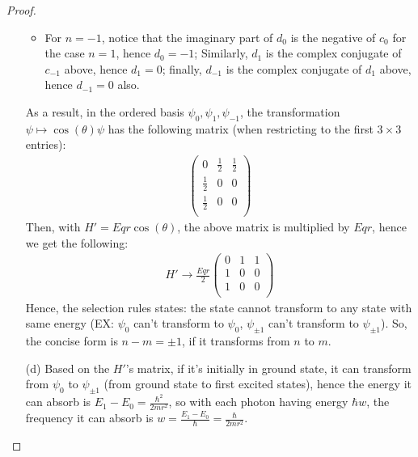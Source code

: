 \documentclass{article}
\begin{document}
\begin{proof}
\begin{itemize}
\begin{itemize}
            \item For $n=-1$, notice that the imaginary part of $d_0$ is the negative of $c_0$ for the case $n=1$, hence $d_0=-1$; Similarly, $d_1$ is the complex conjugate of $c_{-1}$ above, hence $d_1=0$; finally, $d_{-1}$ is the complex conjugate of $d_1$ above, hence $d_{-1}=0$ also.
        \end{itemize}
        As a result, in the ordered basis $\psi_0,\psi_1,\psi_{-1}$, the transformation $\psi\mapsto \cos(\theta)\psi$ has the following matrix (when restricting to the first $3\times 3$ entries):
        \begin{align}
            \begin{pmatrix}
                0 & \frac{1}{2} & \frac{1}{2}\\
                \frac{1}{2} & 0 & 0\\
                \frac{1}{2} & 0 & 0\\
            \end{pmatrix}
        \end{align}
        Then, with $H' = Eqr\cos(\theta)$, the above matrix is multiplied by $Eqr$, hence we get the following:
        \begin{align}
            H' \longrightarrow \frac{Eqr}{2}\begin{pmatrix}
                0 & 1 & 1\\
                1 & 0 & 0\\
                1 & 0 & 0\\
            \end{pmatrix}
        \end{align}
        Hence, the selection rules states: the state cannot transform to any state with same energy (EX: $\psi_0$ can't transform to $\psi_0$, $\psi_{\pm 1}$ can't transform to $\psi_{\pm 1}$). So, the concise form is $n-m = \pm 1$, if it transforms from $n$ to $m$.

        \hfil

        \item[(d)] Based on the $H'$'s matrix, if it's initially in ground state, it can transform from $\psi_0$ to $\psi_{\pm 1}$ (from ground state to first excited states), hence the energy it can absorb is $E_1-E_0 = \frac{\hbar^2}{2mr^2}$, so with each photon having energy $\hbar w$, the frequency it can absorb is $w=\frac{E_1-E_0}{\hbar}=\frac{\hbar}{2mr^2}$.
        
        \hfil


\end{itemize}
\end{proof}
\end{document}
